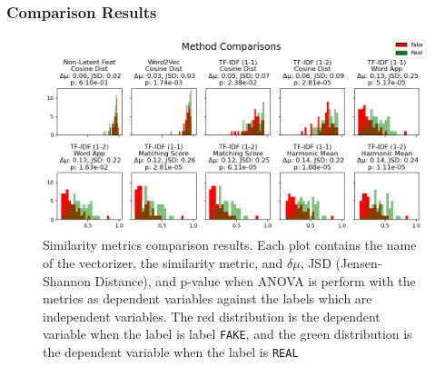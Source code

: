 \documentclass{article}
\begin{document}
\subsubsection{Comparison Results} \label{section:similarity-results}
\begin{figure}[h]
  \centering
  \includegraphics[width=\textwidth]{img/textual_relevance_3.png}
  \caption{Similarity metrics comparison results. Each plot contains the name of the vectorizer, the similarity metric, and $\delta \mu$, JSD (Jensen-Shannon Distance), and p-value when ANOVA is perform with the metrics as dependent variables against the labels which are independent variables. The red distribution is the dependent variable when the label is label \texttt{FAKE}, and the green distribution is the dependent variable when the label is \texttt{REAL}}
  \label{similarity-metrics}
\end{figure}
\end{document}
